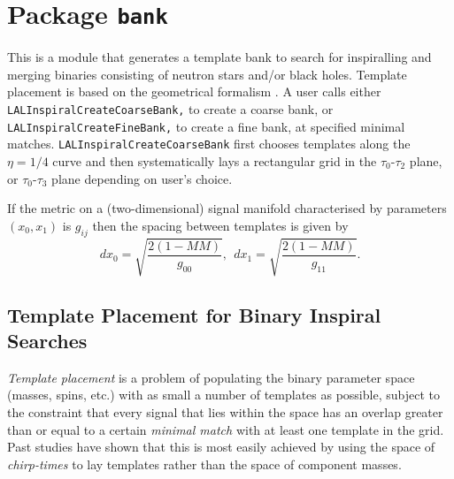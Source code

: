 \chapter{Package \texttt{bank}}

This is a module that generates a template bank to search for
inspiralling and merging binaries consisting of neutron stars
and/or black holes. Template placement is based on the geometrical
formalism \cite{Owen:96,OwenAndSathyaprakash:99}.  A user
calls either \texttt{LALInspiralCreateCoarseBank,}
to create a coarse bank, or \texttt{LALInspiralCreateFineBank,}
to create a fine bank, at specified minimal matches.
\texttt{LALInspiralCreateCoarseBank} first chooses templates
along the $\eta=1/4$ curve and then systematically lays a
rectangular grid in the $\tau_0$-$\tau_2$ plane, or $\tau_0$-$\tau_3$
plane depending on user's choice.

If the metric on a (two-dimensional) signal manifold characterised
by parameters $(x_0,x_1)$ is $g_{ij}$ then the spacing between templates
is given by
\begin{equation}
   dx_0 = \sqrt{ \frac{2(1 -MM)}{g_{00}} },\ \
   dx_1 = \sqrt{ \frac{2(1 -MM)}{g_{11}} }.
\end{equation}

\section{Template Placement for Binary Inspiral Searches}
{\it Template placement} is a problem of populating the binary
parameter space (masses, spins, etc.) with as small a number of
templates as possible, subject to the constraint that every signal
that lies within the space has an overlap greater
than or equal to a certain {\it minimal match} with at least one template in
the grid. Past studies \cite {Sathyaprakash and Dhurandhar 1991, Sathyaprakash 1994, OwenAndSathyaprakash:99}
have shown that this is most easily achieved by using the space of
{\it chirp-times} to lay templates rather than the space of component masses.

